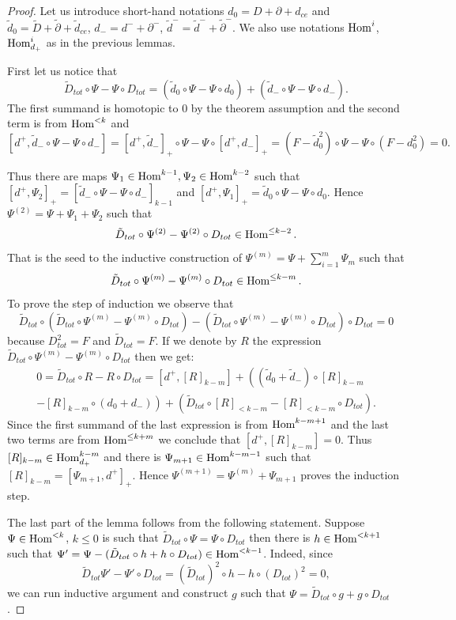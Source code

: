 \begin{proof}
Let us introduce short-hand notations $d_0=D+\partial+d_{ce}$ and $\tilde{d}_0=\tilde{D}+\tilde{\partial}+\tilde{d}_{ce}$, $d_-=d^-+\partial^-$, $\tilde{d}^-=\tilde{d}^-+\tilde{\partial}^-$. We also use notations
$\mathop{{\rm Hom}}\nolimits^i$, $\mathop{{\rm Hom}}\nolimits_{d_+}^{i}$ as in the previous lemmas.

First let us notice that
$$ \tilde{D}_{tot}\circ \Psi-\Psi\circ D_{tot}=\left( \tilde{d}_0\circ \Psi-\Psi\circ d_0\right)+\left(\tilde{d}_-\circ \Psi-\Psi\circ d_-\right).$$
The first summand is homotopic to $0$ by the theorem assumption and the second term is from $\mathop{{\rm Hom}}\nolimits^{<k}$ and
$$ [d^+,\tilde{d}_-\circ \Psi-\Psi\circ d_-]= [d^+,\tilde{d}_-]_+\circ \Psi-\Psi\circ [d^+,d_-]_+=(F-\tilde{d}_0^2)\circ\Psi-\Psi\circ (F-d_0^2)=0.$$

Thus there are maps $\Psi_1\in \mathop{{\rm Hom}}\nolimits^{k-1}, \Psi_2\in \mathop{{\rm Hom}}\nolimits^{k-2}$ such that $[d^+,\Psi_2]_+=[\tilde{d}_-\circ \Psi-\Psi\circ d_-]_{k-1}$ and
$[d^+,\Psi_1]_+= \tilde{d}_0\circ \Psi-\Psi\circ d_0$. Hence $\Psi^{(2)}=\Psi+\Psi_1+\Psi_2$ such that
$$ \tilde{D}_{tot}\circ \Psi^{(2)}-\Psi^{(2)}\circ D_{tot}\in \mathop{{\rm Hom}}\nolimits^{\le k-2}.$$
That is the seed to the inductive construction of $\Psi^{(m)}=\Psi+\sum_{i=1}^m \Psi_m$ such that
$$ \tilde{D}_{tot}\circ \Psi^{(m)}-\Psi^{(m)}\circ D_{tot}\in \mathop{{\rm Hom}}\nolimits^{\le k-m}.$$
To prove the step of induction we observe that
$$\tilde{D}_{tot}\circ\left(  \tilde{D}_{tot}\circ \Psi^{(m)}-\Psi^{(m)}\circ D_{tot}\right)-\left(  \tilde{D}_{tot}\circ \Psi^{(m)}-\Psi^{(m)}\circ D_{tot}\right)\circ D_{tot}=0 $$
because $D_{tot}^2=F$ and $\tilde{D}_{tot}=F$. If we denote by $R$ the expression $\tilde{D}_{tot}\circ \Psi^{(m)}-\Psi^{(m)}\circ D_{tot}$ then we get:
\begin{multline*}
  0=\tilde{D}_{tot}\circ R-R\circ D_{tot}=[d^+, [R]_{k-m}]+\left((\tilde{d}_0+\tilde{d}_-)\circ [R]_{k-m}\right.\\
  \left.-
[R]_{k-m}\circ(d_0+d_-)\right)+\left(\tilde{D}_{tot}\circ [R]_{<k-m}-[R]_{<k-m}\circ D_{tot}\right).
\end{multline*}
Since the first summand of the last expression is from $\mathop{{\rm Hom}}\nolimits^{k-m+1}$ and the last two terms are from $\mathop{{\rm Hom}}\nolimits^{\le k+m}$ we conclude that
$[d^+,[R]_{k-m}]=0$. Thus $[R]_{k-m}\in \mathop{{\rm Hom}}\nolimits_{d_+}^{k-m}$ and there is $\Psi_{m+1}\in \mathop{{\rm Hom}}\nolimits^{k-m-1}$ such that $[R]_{k-m}=[\Psi_{m+1},d^+]_+$.
Hence $\Psi^{(m+1)}=\Psi^{(m)}+\Psi_{m+1}$ proves the induction step.

The last part of the lemma follows from the following statement. Suppose $\Psi\in \mathop{{\rm Hom}}\nolimits^{<k}$, $k\le 0$ is such that $\tilde{D}_{tot}\circ \Psi=\Psi\circ D_{tot}$ then there
is $h\in \mathop{{\rm Hom}}\nolimits^{<k+1}$ such that $\Psi'=\Psi-(\tilde{D}_{tot}\circ h+ h\circ D_{tot})\in \mathop{{\rm Hom}}\nolimits^{<k-1} $. Indeed, since
$$\tilde{D}_{tot}\Psi'-\Psi'\circ D_{tot}=(\tilde{D}_{tot})^2\circ h-h\circ (D_{tot})^2=0,$$
we can run inductive argument and construct $g$ such that $\Psi=\tilde{D}_{tot}\circ g+ g\circ D_{tot}$.


\end{proof}
